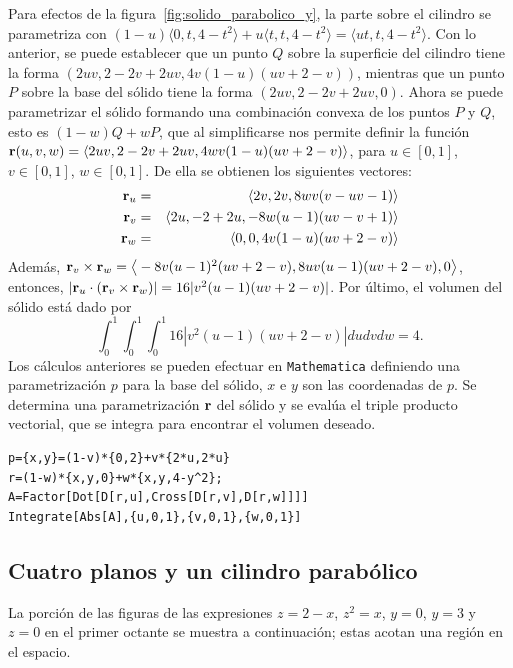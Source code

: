 Para efectos de la figura~\ref{fig:solido_parabolico_y}, la parte sobre el cilindro se parametriza con
$(1-u)\langle 0,t,4-t^{2}\rangle +u\langle t,t,4-t^{2}\rangle=\langle ut,t,4-t^{2}\rangle$.
Con lo anterior, se puede establecer que un punto $Q$ sobre la superficie del cilindro tiene la forma
$(2uv,2-2v+2uv,4v(1-u)(uv+2-v))$, mientras que un punto $P$ sobre la base del sólido tiene la forma $(2uv,2-2v+2uv,0)$.
Ahora se puede parametrizar el sólido formando una combinación convexa de los puntos $P$ y $Q$,
esto es $(1-w)Q+wP$,
que al simplificarse nos permite definir la función
${\bf r}( u,v,w) = \langle 2uv,2-2v+2uv,4wv(1-u)(uv+2-v)\rangle$,
para $u\in [0,1]$, $v\in [0,1]$, $w\in [0,1]$. De ella se obtienen los siguientes vectores:
\begin{eqnarray*}
  {\bf r}_{u}&=& \langle 2v,2v,8wv( v-uv-1)\rangle \\
  {\bf r}_{v}&=& \langle 2u,-2+2u,-8w(u-1) ( uv-v+1) \rangle \\
  {\bf r}_{w}&=& \langle 0,0,4v( 1-u) (uv+2-v) \rangle
\end{eqnarray*}
Además, ${\bf r}_{v}\times {\bf r}_{w}= \big\langle -8v( u-1)^{2}(uv+2-v),8uv( u-1)(uv+2-v),0 \big \rangle$,
entonces, $ |{\bf r}_{u}\cdot({\bf r}_{v}\times {\bf r}_{w})|=16|v^{2}(u-1)(uv+2-v)|$. Por último, el volumen del sólido está dado por
\[\int_{0}^{1}\int_{0}^{1}\int_{0}^{1}16| v^{2}( u-1)(uv+2-v)|dudvdw= 4.\]
Los cálculos anteriores se pueden efectuar en \verb"Mathematica"
definiendo una parametrización $p$ para la base del sólido, $x$ e $y$ son las coordenadas de $p$. Se determina una parametrización ${\bf r}$ del sólido y se evalúa el triple producto vectorial, que se integra para encontrar el volumen deseado.

\begin{tcolorbox}[title=\bf Instrucción en \verb"Mathematica"]\begin{Verbatim}[formatcom=\letraverbatim]
p={x,y}=(1-v)*{0,2}+v*{2*u,2*u}
r=(1-w)*{x,y,0}+w*{x,y,4-y^2};
A=Factor[Dot[D[r,u],Cross[D[r,v],D[r,w]]]]
Integrate[Abs[A],{u,0,1},{v,0,1},{w,0,1}]
\end{Verbatim}
\end{tcolorbox}

\subsection{Cuatro planos y un cilindro parabólico}

La porción de las figuras de las expresiones $z=2-x$, $z^2=x$, $y=0$, $y=3$ y $z=0$ en el primer octante se muestra a continuación; estas acotan una región en el espacio.

